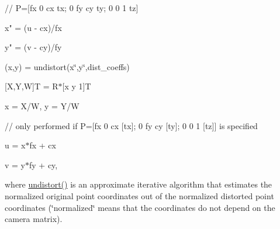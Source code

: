 {\ttfamily }

{\ttfamily }

{\ttfamily // P=\mbox{[}fx\textquotesingle{} 0 cx\textquotesingle{} tx; 0 fy\textquotesingle{} cy\textquotesingle{} ty; 0 0 1 tz\mbox{]}}

{\ttfamily }

{\ttfamily }

{\ttfamily x" = (u -\/ cx)/fx}

{\ttfamily }

{\ttfamily }

{\ttfamily y" = (v -\/ cy)/fy}

{\ttfamily }

{\ttfamily }

{\ttfamily (x\textquotesingle{},y\textquotesingle{}) = undistort(x\char`\"{},y\char`\"{},dist\+\_\+coeffs)}

{\ttfamily }

{\ttfamily }

{\ttfamily \mbox{[}X,Y,W\mbox{]}T = R$\ast$\mbox{[}x\textquotesingle{} y\textquotesingle{} 1\mbox{]}T}

{\ttfamily }

{\ttfamily }

{\ttfamily x = X/W, y = Y/W}

{\ttfamily }

{\ttfamily }

{\ttfamily // only performed if P=\mbox{[}fx\textquotesingle{} 0 cx\textquotesingle{} \mbox{[}tx\mbox{]}; 0 fy\textquotesingle{} cy\textquotesingle{} \mbox{[}ty\mbox{]}; 0 0 1 \mbox{[}tz\mbox{]}\mbox{]} is specified}

{\ttfamily }

{\ttfamily }

{\ttfamily u\textquotesingle{} = x$\ast$fx\textquotesingle{} + cx\textquotesingle{}}

{\ttfamily }

{\ttfamily }

{\ttfamily v\textquotesingle{} = y$\ast$fy\textquotesingle{} + cy\textquotesingle{},}

{\ttfamily }

{\ttfamily }

{\ttfamily where {\ttfamily \mbox{\hyperlink{classorg_1_1opencv_1_1imgproc_1_1_imgproc_a0733bf11be8125dfc28b6ff4da746927}{undistort()}}} is an approximate iterative algorithm that estimates the normalized original point coordinates out of the normalized distorted point coordinates (\char`\"{}normalized\char`\"{} means that the coordinates do not depend on the camera matrix). }

